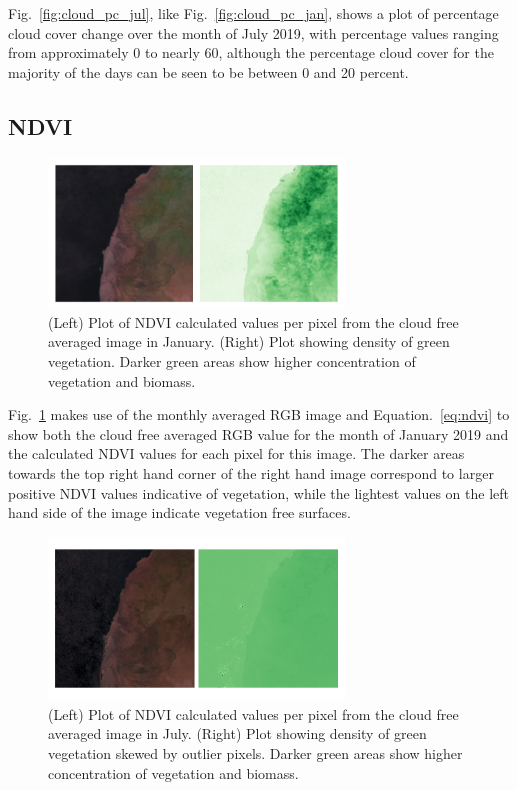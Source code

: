 Fig.~\ref{fig:cloud_pc_jul}, like Fig.~\ref{fig:cloud_pc_jan}, shows a plot of percentage cloud cover change over the month of July 2019, with percentage values ranging from approximately 0 to nearly 60, although the percentage cloud cover for the majority of the days can be seen to be between 0 and 20 percent. 

\subsection{NDVI}

\begin{figure}[H]
    \centering
    \includegraphics[width=0.7\textwidth]{ndvi_av_jan+av_jan.png}
    \caption{(Left) Plot of NDVI calculated values per pixel from the cloud free averaged image in January. (Right) Plot showing density of green vegetation. Darker green areas show higher concentration of vegetation and biomass.}
    \label{fig:ndvi_jan_av}
\end{figure}

Fig.~\ref{fig:ndvi_jan_av} makes use of the monthly averaged RGB image and Equation.~\ref{eq:ndvi} to show both the cloud free averaged RGB value for the month of January 2019 and the calculated NDVI values for each pixel for this image. The darker areas towards the top right hand corner of the right hand image correspond to larger positive NDVI values indicative of vegetation, while the lightest values on the left hand side of the image indicate vegetation free surfaces.

\begin{figure}[H]
    \centering
    \includegraphics[width=0.7\textwidth]{ndvi_av_jul+av_jul.png}
    \caption{(Left) Plot of NDVI calculated values per pixel from the cloud free averaged image in July. (Right) Plot showing density of green vegetation skewed by outlier pixels. Darker green areas show higher concentration of vegetation and biomass.}
    \label{fig:ndvi_jul_av}
\end{figure}

